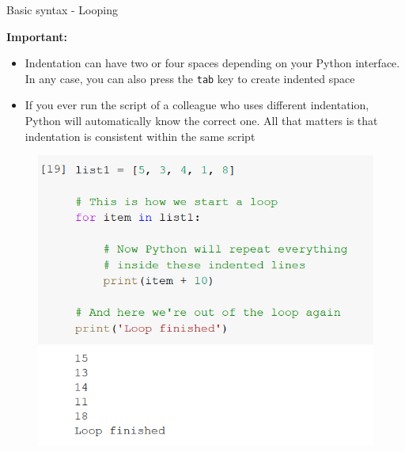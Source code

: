 \documentclass[aspectratio=169]{beamer}
\begin{document}
\begin{frame}{Basic syntax - Looping}

	\textbf{Important:}

	\begin{multicols}{2}
	
		\begin{itemize}
			\item Indentation can have two or four spaces depending on your Python interface. In any case, you can also press the \texttt{tab} key to create indented space
			\item If you ever run the script of a colleague who uses different indentation, Python will automatically know the correct one. All that matters is that indentation is consistent within the same script
		\end{itemize}
		\begin{figure}
			\centering
			\includegraphics[width=\linewidth]{img/list_loop.png}
		\end{figure}

	\end{multicols}

\end{frame}
\end{document}
